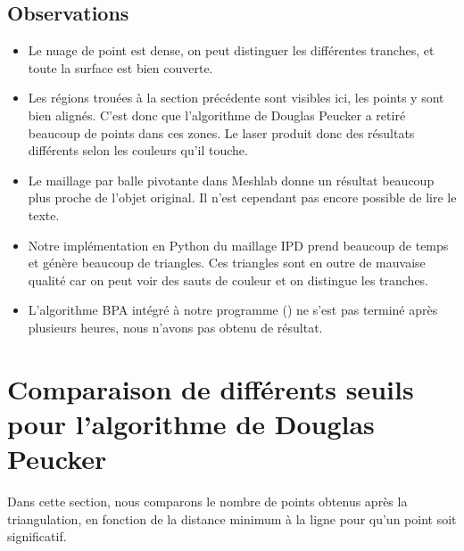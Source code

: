 \documentclass[a4paper,10pt]{report}
\begin{document}
\subsection{Observations}
\begin{itemize}
	\item Le nuage de point est dense, on peut distinguer les différentes tranches, et toute la surface est bien couverte.
    \item Les régions trouées à la section précédente sont visibles ici, les points y sont bien alignés. C'est donc que l'algorithme de Douglas Peucker a retiré beaucoup de points dans ces zones. Le laser produit donc des résultats différents selon les couleurs qu'il touche.
    \item Le maillage par balle pivotante dans Meshlab donne un résultat beaucoup plus proche de l'objet original. Il n'est cependant pas encore possible de lire le texte.
    \item Notre implémentation en Python du maillage IPD prend beaucoup de temps et génère beaucoup de triangles. Ces triangles sont en outre de mauvaise qualité car on peut voir des sauts de couleur et on distingue les tranches.
    \item L'algorithme BPA intégré à notre programme (\cite{Digne}) ne s'est pas terminé après plusieurs heures, nous n'avons pas obtenu de résultat.
\end{itemize}

\section{Comparaison de différents seuils pour l'algorithme de Douglas Peucker}

Dans cette section, nous comparons le nombre de points obtenus après la triangulation, en fonction de la distance minimum à la ligne pour qu'un point soit significatif.
\end{document}
